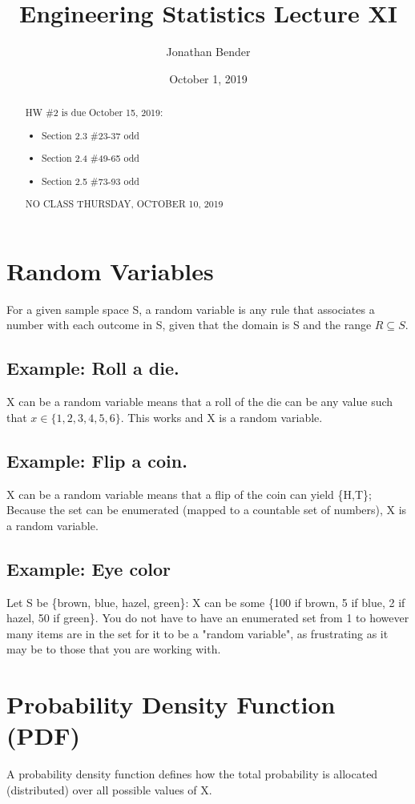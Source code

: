 \documentclass[]{article}
\title{Engineering Statistics Lecture XI}
\author{Jonathan Bender}
\date{October 1, 2019}
\begin{document}
	
	\maketitle
	
	\begin{abstract}	
		HW \#2 is due October 15, 2019:
		\begin{itemize}
			\item Section 2.3 \#23-37 odd
			\item Section 2.4 \#49-65 odd
			\item Section 2.5 \#73-93 odd
		\end{itemize}
	
		NO CLASS THURSDAY, OCTOBER 10, 2019
	\end{abstract}

	\section{Random Variables}
	For a given sample space S, a random variable is any rule that associates a number with each outcome in S, given that the domain is S and the range $R \subseteq S$.
	
		\subsection{Example: Roll a die.}
		X can be a random variable means that a roll of the die can be any value such that $x\in\{1, 2, 3, 4, 5, 6\}$. This works and X is a random variable.
	
		\subsection{Example: Flip a coin.}
		X can be a random variable means that a flip of the coin can yield \{H,T\}; Because the set can be enumerated (mapped to a countable set of numbers), X is a random variable.
	
		\subsection{Example: Eye color}
		Let S be \{brown, blue, hazel, green\}: X can be some \{100 if brown, 5 if blue, 2 if hazel, 50 if green\}. You do not have to have an enumerated set from 1 to however many items are in the set for it to be a "random variable", as frustrating as it may be to those that you are working with.
	
	\section{Probability Density Function (PDF)}
	A probability density function defines how the total probability is allocated (distributed) over all possible values of X.
	
\end{document}
